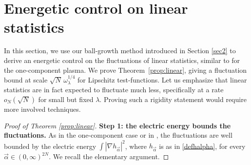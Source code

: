 \documentclass[a4paper,10pt,leqno]{amsart}
\numberwithin{equation}{section}
\def\nab{\nabla}
\begin{document}
\section{Energetic control on linear statistics}\label{sec5}
In this section, we use our ball-growth method introduced in Section \ref{sec2} to derive an energetic control on the fluctuations of linear statistics, similar to \cite[Prop. 2.5]{LS2} for the one-component plasma. We prove Theorem~\ref{prop:linear}, giving a fluctuation bound at scale $\sqrt N\,\omega_\lambda^{1/4}$ for Lipschitz test-functions. Let us emphasize that linear statistics are in fact expected to fluctuate much less, specifically at a rate $o_N(\sqrt{N})$ for small but fixed $\lambda$. Proving such a rigidity statement would require more involved techniques.

\begin{proof}[Proof of Theorem \ref{prop:linear}]
  \textbf{Step 1: the electric energy bounds the fluctuations.} As in the one-component case \cite{ss1d,LS2} or in \cite{LSZ}, the fluctuations are well bounded by the electric energy $
  \int |\nab h_{\vec{\alpha}}|^2$, where $h_{\vec{\alpha}}$ is as in \eqref{defhalpha}, for every $\vec\alpha\in(0,\infty)^{2N}$. We recall the elementary argument.


\end{proof}
\end{document}
